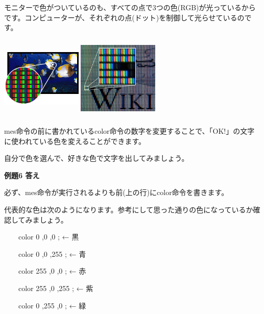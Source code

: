 \documentclass[a4paper,12pt]{jarticle}
\begin{document}
モニターで色がついているのも、すべての点で3つの色(RGB)が光っているからです。コンピューターが、それぞれの点(ドット)を制御して光らせているのです。


\bigskip
\bigskip

\begin{minipage}{11.781cm}
\centering
{\upshape
\includegraphics[keepaspectratio,width=3.854cm,height=3.988cm]{text02-img/text02-img034.jpg}
\includegraphics[keepaspectratio,width=3.854cm,height=3.988cm]{text02-img/text02-img035.jpg}}
\end{minipage}

\bigskip
\bigskip
\bigskip

mes命令の前に書かれているcolor命令の数字を変更することで、「OK!」の文字に使われている色を変えることができます。

自分で色を選んで、好きな色で文字を出してみましょう。

\bigskip


\bigskip

{\bfseries
例題6 答え}


\bigskip

必ず、mes命令が実行されるよりも前(上の行)にcolor命令を書きます。

代表的な色は次のようになります。参考にして思った通りの色になっているか確認してみましょう。

\bigskip

\ \ \ \ color 0 ,0 ,0 ; ← 黒 

\ \ \ \ color 0 ,0 ,255 ; ← 青 

\ \ \ \ color 255 ,0 ,0 ; ← 赤 

\ \ \ \ color 255 ,0 ,255 ; ← 紫 

\ \ \ \ color 0 ,255 ,0 ; ← 緑 
\end{document}
